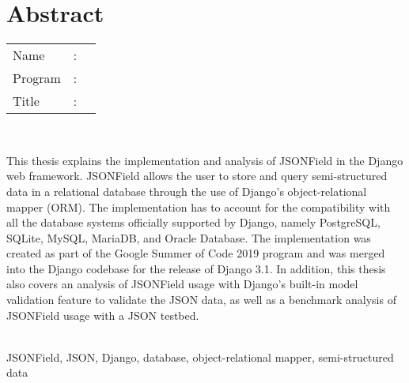 %
%
%

\chapter*{Abstract}
\singlespacing

\vspace*{0.2cm}

\noindent \begin{tabular}{l l p{11.0cm}}
	Name&: & \penulis \\
	Program&: & \program \\
	Title&: & \judulInggris \\
\end{tabular} \\

\vspace*{0.5cm}

\noindent
This thesis explains the implementation and analysis of JSONField in the Django
web framework. JSONField allows the user to store and query semi-structured
data in a relational database through the use of Django's object-relational
mapper (ORM). The implementation has to account for the compatibility with all
the database systems officially supported by Django, namely PostgreSQL, SQLite,
MySQL, MariaDB, and Oracle Database. The implementation was created as part of
the Google Summer of Code 2019 program and was merged into the Django codebase
for the release of Django 3.1. In addition, this thesis also covers an analysis
of JSONField usage with Django's built-in model validation feature to validate
the JSON data, as well as a benchmark analysis of JSONField usage with a JSON
testbed.\\

\vspace*{0.2cm}

\noindent {} \\
JSONField, JSON, Django, database, object-relational mapper, semi-structured
data \\

\onehalfspacing
\newpage
